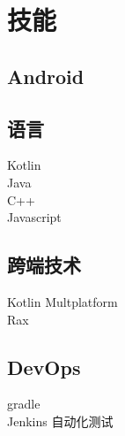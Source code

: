\documentclass[]{deedy-resume-openfont}
\begin{document}
\begin{minipage}[t]{0.2\textwidth}

\sectionsep
\section{技能}
\sectionsep
\subsection{Android}
\sectionsep
{}
\sectionsep
\subsection{语言}
\sectionsep
Kotlin \textbullet{} \\
Java \textbullet{} \\ 
C++ \textbullet{} \\
Javascript \\
\sectionsep

\subsection{跨端技术}
\sectionsep
Kotlin Multplatform \textbullet{} \\
Rax \\
\sectionsep

\subsection{DevOps}
\sectionsep
gradle \\
Jenkins \textbullet{} 自动化测试

%
%

\end{minipage} 
\hfill
\end{document}
